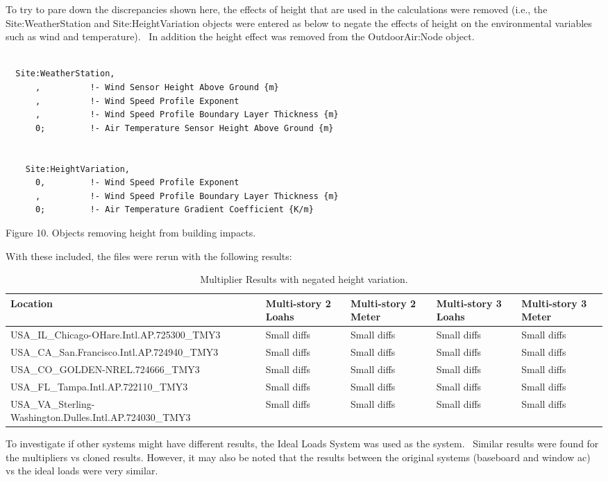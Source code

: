 To try to pare down the discrepancies shown here, the effects of height that are used in the calculations were removed (i.e., the Site:WeatherStation and Site:HeightVariation objects were entered as below to negate the effects of height on the environmental variables such as wind and temperature).~ In addition the height effect was removed from the OutdoorAir:Node object.

\begin{lstlisting}

  Site:WeatherStation,
      ,          !- Wind Sensor Height Above Ground {m}
      ,          !- Wind Speed Profile Exponent
      ,          !- Wind Speed Profile Boundary Layer Thickness {m}
      0;         !- Air Temperature Sensor Height Above Ground {m}


    Site:HeightVariation,
      0,         !- Wind Speed Profile Exponent
      ,          !- Wind Speed Profile Boundary Layer Thickness {m}
      0;         !- Air Temperature Gradient Coefficient {K/m}
\end{lstlisting}

Figure 10. Objects removing height from building impacts.

With these included, the files were rerun with the following results:

\begin{longtable}[c]{p{1.2in}p{1.2in}p{1.2in}p{1.2in}p{1.2in}}
\caption{Multiplier Results with negated height variation. \protect \label{table:multiplier-results-with-negated-height}}\\
\toprule 
Location & Multi-story 2 Loahs & Multi-story 2 Meter & Multi-story 3 Loahs & Multi-story 3 Meter \tabularnewline \midrule
\endhead
USA\_IL\_Chicago-OHare.Intl.AP.725300\_TMY3 & Small diffs & Small diffs & Small diffs & Small diffs \tabularnewline
USA\_CA\_San.Francisco.Intl.AP.724940\_TMY3 & Small diffs & Small diffs & Small diffs & Small diffs \tabularnewline
USA\_CO\_GOLDEN-NREL.724666\_TMY3 & Small diffs & Small diffs & Small diffs & Small diffs \tabularnewline
USA\_FL\_Tampa.Intl.AP.722110\_TMY3 & Small diffs & Small diffs & Small diffs & Small diffs \tabularnewline
USA\_VA\_Sterling-Washington.Dulles.Intl.AP.724030\_TMY3 & Small diffs & Small diffs & Small diffs & Small diffs \tabularnewline
\bottomrule
\end{longtable}

To investigate if other systems might have different results, the Ideal Loads System was used as the system.~ Similar results were found for the multipliers vs cloned results. However, it may also be noted that the results between the original systems (baseboard and window ac) vs the ideal loads were very similar.

